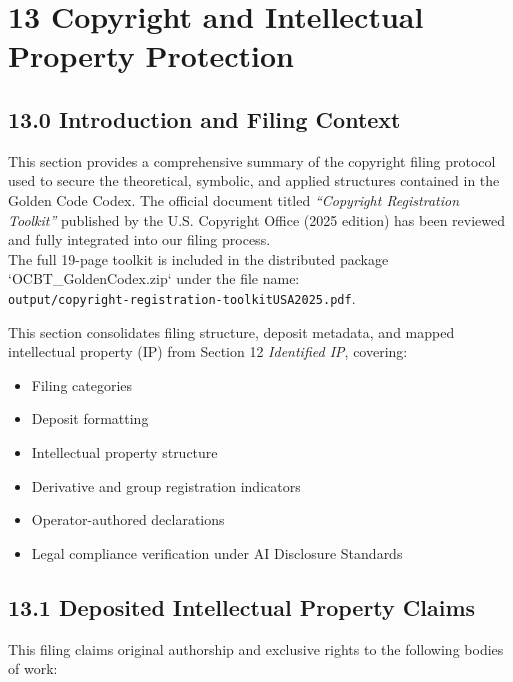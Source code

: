 \section*{13 Copyright and Intellectual Property Protection}

\subsection*{13.0 Introduction and Filing Context}
\noindent
This section provides a comprehensive summary of the copyright filing protocol used to secure the theoretical, symbolic, and applied structures contained in the Golden Code Codex. The official document titled \textit{``Copyright Registration Toolkit''} published by the U.S. Copyright Office (2025 edition) has been reviewed and fully integrated into our filing process.\\

The full 19-page toolkit is included in the distributed package `OCBT\_GoldenCodex.zip` under the file name:\\
\texttt{output/copyright-registration-toolkitUSA2025.pdf}.

This section consolidates filing structure, deposit metadata, and mapped intellectual property (IP) from Section 12 \textit{Identified IP}, covering:

\begin{itemize}
  \item Filing categories
  \item Deposit formatting
  \item Intellectual property structure
  \item Derivative and group registration indicators
  \item Operator-authored declarations
  \item Legal compliance verification under AI Disclosure Standards
\end{itemize}

\subsection*{13.1 Deposited Intellectual Property Claims}
\noindent
This filing claims original authorship and exclusive rights to the following bodies of work:


